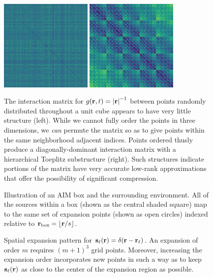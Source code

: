 \begin{figure}
  \centering
  \includegraphics[width=0.4\textwidth]{figures/dist_mat_unsorted}
  \hspace{1cm}
  \includegraphics[width=0.4\textwidth]{figures/dist_mat_sorted}
  \caption{\label{fig:matrix structure} The interaction matrix for $g(\vb{r}, t) = \abs{\vb{r}}^{-1}$ between points randomly distributed throughout a unit cube appears to have very little structure (left).
    While we cannot fully order the points in three dimensions, we \emph{can} permute the matrix so as to give points within the same neighborhood adjacent indices.
    Points ordered thusly produce a diagonally-dominant interaction matrix with a hierarchical Toeplitz substructure (right).
    Such structures indicate portions of the matrix have very accurate low-rank approximations that offer the possibility of significant compression.
  }
\end{figure}

\begin{figure}
  \centering
  
  \caption{\label{fig:aim terminology} Illustration of an AIM box and the surrounding environment.
    All of the sources within a box (shown as the central shaded square) map to the same set of expansion points (shown as open circles) indexed relative to $\vb{r}_\text{box} = \lfloor\vb{r}/s\rfloor$.
  }
\end{figure}

\begin{figure}
  \centering
  \caption{\label{fig:expansion grid}Spatial expansion pattern for $\vb{s}_\ell(\vb{r}) = \delta(\vb{r} - \vb{r}_\ell)$.
    An expansion of order $m$ requires $(m + 1)^3$ grid points.
    Moreover, increasing the expansion order incorporates new points in such a way as to keep $\vb{s}_\ell(\vb{r})$ as close to the center of the expansion region as possible.
  }
\end{figure}

